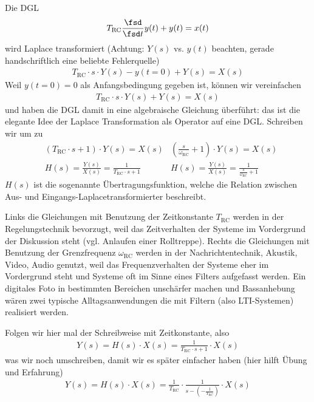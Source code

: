 \begin{ExCalc}
Die DGL
\begin{align}
T_\mathrm{RC}\frac{\fsd}{\fsd t} y(t) + y(t) = x(t)\\
\end{align}
wird Laplace transformiert (Achtung: $Y(s)$ vs. $y(t)$ beachten,
gerade handschriftlich eine beliebte Fehlerquelle)
\begin{align}
T_\mathrm{RC} \cdot s \cdot Y(s) - y(t=0) + Y(s) = X(s)
\end{align}
Weil $y(t=0)=0$ als Anfangsbedingung gegeben ist, können wir vereinfachen
\begin{align}
T_\mathrm{RC} \cdot s \cdot Y(s) + Y(s) = X(s)
\end{align}
und haben die DGL damit in eine algebraische Gleichung überführt: das ist die
elegante Idee der Laplace Transformation als Operator auf eine DGL.
%
Schreiben wir um zu
\begin{align}
&(T_\mathrm{RC} \cdot s + 1 ) \cdot Y(s) = X(s)
& (\frac{s}{\omega_\mathrm{RC}} + 1 ) \cdot Y(s) = X(s) \\
&H(s) = \frac{Y(s)}{X(s)} = \frac{1}{T_\mathrm{RC} \cdot s + 1}
&H(s) = \frac{Y(s)}{X(s)} = \frac{1}{\frac{s}{\omega_\mathrm{RC}} + 1}
\end{align}
%
$H(s)$ ist die sogenannte Übertragungsfunktion, welche
die Relation zwischen Aus- und Eingangs-Laplacetransformierter beschreibt.

Links die Gleichungen mit Benutzung der Zeitkonstante $T_\mathrm{RC}$ werden in der
Regelungstechnik bevorzugt, weil das Zeitverhalten der Systeme im Vordergrund
der Diskussion steht (vgl. Anlaufen einer Rolltreppe).
%
Rechts die Gleichungen mit Benutzung der Grenzfrequenz $\omega_\mathrm{RC}$ werden
in der Nachrichtentechnik, Akustik, Video, Audio genutzt, weil das Frequenzverhalten
der Systeme eher im Vordergrund steht und Systeme oft im Sinne eines Filters
aufgefasst werden. Ein digitales Foto in bestimmten Bereichen unschärfer machen und
Bassanhebung wären zwei typische Alltagsanwendungen die mit Filtern
(also LTI-Systemen) realisiert werden.

Folgen wir hier mal der Schreibweise mit Zeitkonstante, also
\begin{align}
Y(s) = H(s) \cdot X(s) = \frac{1}{T_\mathrm{RC} \cdot s + 1} \cdot X(s)
\end{align}
was wir noch umschreiben, damit wir es später einfacher haben (hier hilft Übung und Erfahrung)
\begin{align}
Y(s) = H(s) \cdot X(s) = \frac{1}{T_\mathrm{RC}} \cdot \frac{1}{s - (-\frac{1}{T_\mathrm{RC}})} \cdot X(s)
\end{align}


\end{ExCalc}
